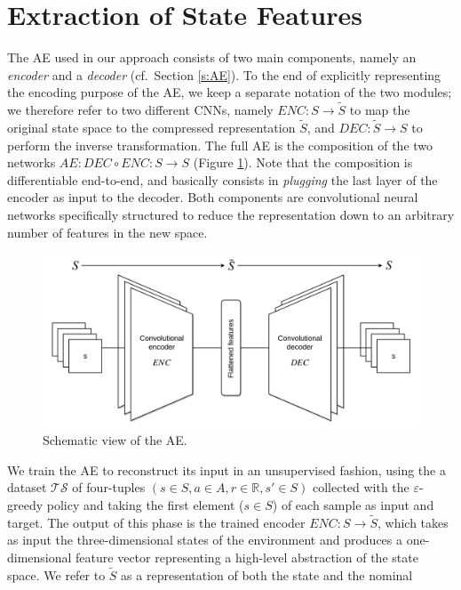 \section{Extraction of State Features}
The AE used in our approach consists of two main components, namely an 
\textit{encoder} and a \textit{decoder} (cf.\ Section \ref{s:AE}). To the end of 
explicitly representing the encoding purpose of the AE, we keep a separate 
notation of the two modules; we therefore refer to two different CNNs, namely 
$ENC: S \rightarrow \tilde{S}$ to map the original state space to the 
compressed representation $\tilde{S}$, and $DEC: \tilde{S} \rightarrow S$ 
to perform the inverse transformation. The full AE is the composition of the
two networks $AE: DEC \circ ENC: S \rightarrow S$ (Figure \ref{f:ae}). 
Note that the composition is differentiable end-to-end, and basically consists 
in \textit{plugging} the last layer of the encoder as input to the decoder. 
Both components are convolutional neural networks specifically structured to 
reduce the representation down to an arbitrary number of features in the new 
space.
%
\begin{figure}
    \includegraphics[width=\textwidth]{pictures/conv_autoencoder}
    \centering
    \caption[Schematic view of the AE]{Schematic view of the AE.}
    \label{f:ae}
\end{figure}
%
We train the AE to reconstruct its input in an unsupervised fashion, using the a
dataset $\mathcal{TS}$ of four-tuples $(s \in S, a \in A, r \in \mathbb{R}, s' \in S)$ 
collected with the $\varepsilon$-greedy policy and taking the first element ($s \in S$) 
of each sample as input and target. 
The output of this phase is the trained encoder $ENC: S \rightarrow \tilde{S}$, 
which takes as input the three-dimensional states of the environment and 
produces a one-dimensional feature vector representing a high-level abstraction 
of the state space.
We refer to $\tilde{S}$ as a representation of both the state and the nominal 
